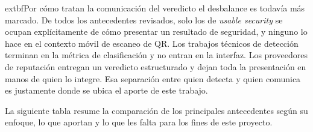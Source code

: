 	extbf{Por cómo tratan la comunicación del veredicto} el desbalance es todavía más
marcado. De todos los antecedentes revisados, solo los de \emph{usable security}
\cite{cranor2008framework,egelman2008warned,akhawe2013alice} se ocupan explícitamente de
cómo presentar un resultado de seguridad, y ninguno lo hace en el contexto móvil de
escaneo de QR. Los trabajos técnicos de detección
\cite{sahoo2017malicious,sheng2009empirical,ma2009beyond,le2011phishdef} terminan en la
métrica de clasificación y no entran en la interfaz. Los proveedores de reputación
\cite{google_safebrowsing,virustotal_apiv3,phishtank_devinfo,urlhaus_api} entregan un
veredicto estructurado y dejan toda la presentación en manos de quien lo integre. Esa
separación entre quien detecta y quien comunica es justamente donde se ubica el aporte de
este trabajo.

La siguiente tabla resume la comparación de los principales antecedentes según su
enfoque, lo que aportan y lo que les falta para los fines de este proyecto.


